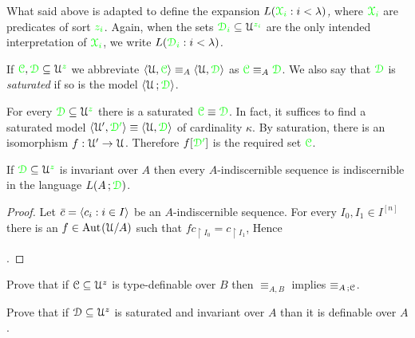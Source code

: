 What said above is adapted to define the expansion  \emph{$L({\color{green}\EuScript X_i}:i<\lambda)$,} where ${\color{green}\EuScript X_i}$ are predicates of sort ${\color{green} z_i}$.
Again, when the sets ${\color{green}\EuScript D_i}\subseteq\EuScript U^{\color{green} z_i}$ are the only intended interpretation of  ${\color{green}\EuScript X_i}$, we write \emph{$L({\color{green}\EuScript D_i}:i<\lambda)$.}

\begin{definition}\label{def_ins_sat}
  If ${\color{green}\EuScript C},{\color{green}\EuScript D}\subseteq\EuScript U^{\color{green} z}$ we abbreviate $\langle\EuScript U,{\color{green}\EuScript C}\rangle\equiv_A\langle\EuScript U,{\color{green}\EuScript D}\rangle$ as ${\color{green}\EuScript C}\equiv_A{\color{green}\EuScript D}$.
We also say that ${\color{green}\EuScript D}$ is \emph{saturated\/} if so is the model $\langle\EuScript U\,;{\color{green}\EuScript D}\rangle$.
\end{definition}

\begin{remark}\label{rem_el_sat}
For every ${\color{green}\EuScript D}\subseteq\EuScript U^{\color{green} z}$ there is a saturated ${\color{green}\EuScript C}\equiv{\color{green}\EuScript D}$.
In fact, it suffices to find a saturated model $\langle\EuScript U',{\color{green}\EuScript D'}\rangle\equiv\langle\EuScript U,{\color{green}\EuScript D}\rangle$ of cardinality $\kappa$.
By saturation, there is an isomorphism $f:\EuScript U'\to\EuScript U$.
Therefore $f[{\color{green}\EuScript D'}]$ is the required set ${\color{green}\EuScript C}$.
\end{remark}

\begin{proposition}\label{prop_indiscernible_L(A,D)}
  If ${\color{green}\EuScript D}\subseteq\EuScript U^{\color{green} z}$ is invariant over $A$ then every $A$-indiscernible sequence is indiscernible in the language $L(A\,;{\color{green}\EuScript D})$.
\end{proposition}

\begin{proof}
  Let $\bar c=\langle c_i:i\in I\rangle$ be an $A$-indiscernible sequence.
  For every $I_0,I_1\in I^{[n]}$ there is an $f\in{\rm Aut\kern.15ex}(\EuScript U/A)$ such that $fc_{\restriction I_0}=c_{\restriction I_1}$, Hence 

  .
\end{proof}

\begin{exercise}
  Prove that if $\EuScript C\subseteq\EuScript U^z$ is type-definable over $B$ then $\equiv_{A,B}$ implies $\equiv_{A\,;\EuScript C}$.
\end{exercise} 

\begin{exercise}
  Prove that if $\EuScript D\subseteq\EuScript U^z$ is saturated and invariant over $A$ than it is definable over $A$.
\end{exercise} 




